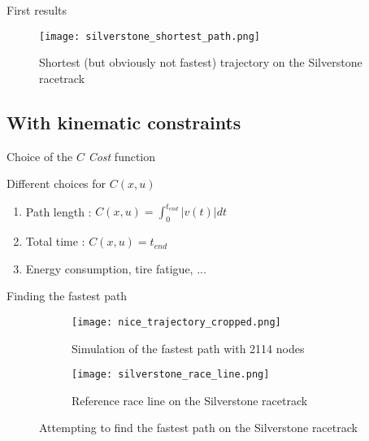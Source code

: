 \documentclass[pdftex,beamer]{beamer}
\theoremstyle{definition}
\theoremstyle{example}
\theoremstyle{plain}
\begin{document}
\begin{frame}{First results}
  \begin{figure}[H]
    \centering
    \texttt{[image: silverstone\_shortest\_path.png]}
    \caption{Shortest (but obviously not fastest) trajectory on the Silverstone racetrack}
  \end{figure}
\end{frame}

\subsection{With kinematic constraints}

\begin{frame}
\end{frame}

\begin{frame}{Choice of the $C$ \textit{Cost} function}
  \begin{exampleblock}{Different choices for $C(x,u)$}
    \begin{enumerate}
      \item Path length : \quad $C(x,u) = \int_{0}^{t_{end}} |v(t)| {dt}$
      \item Total time : \quad $C(x,u) = t_{end}$
      \item Energy consumption, tire fatigue, ...
    \end{enumerate}
    
  \end{exampleblock}
\end{frame}

\begin{frame}{Finding the fastest path}
  \begin{figure}[H]
    \centering
    \begin{subfigure}{0.49\textwidth}
      \centering
      \texttt{[image: nice\_trajectory\_cropped.png]}
      \caption{Simulation of the fastest path with 2114 nodes}
      \label{fig:corner_constraints}
    \end{subfigure}
    \begin{subfigure}{0.49\textwidth}
      \texttt{[image: silverstone\_race\_line.png]}
      \caption{Reference race line on the Silverstone racetrack}
      \label{fig:corner_reference}
    \end{subfigure}
    \caption{Attempting to find the fastest path on the Silverstone racetrack}
  \end{figure}
\end{frame}
\end{document}
